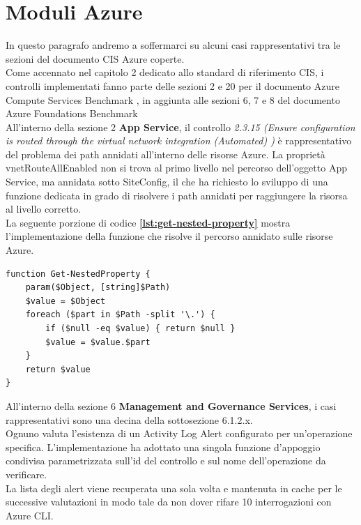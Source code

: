 \documentclass[a4paper,11pt]{report}
\begin{document}
\section{Moduli Azure}

In questo paragrafo andremo a soffermarci su alcuni casi rappresentativi tra le sezioni del documento CIS Azure coperte. \\
Come accennato nel capitolo 2 dedicato allo standard di riferimento CIS, i controlli implementati fanno parte delle sezioni 2 e 20 per il documento Azure Compute Services Benchmark \cite{CIS_Azure_2}, in aggiunta alle sezioni 6, 7 e 8 del documento Azure Foundations Benchmark \cite{CIS_Azure_1} \\

All'interno della sezione 2 \textbf{App Service}, il controllo \textit{2.3.15 (Ensure configuration is routed through the virtual network integration (Automated) )} è rappresentativo del problema dei path annidati all'interno delle risorse Azure. La proprietà vnetRouteAllEnabled non si trova al primo livello nel percorso dell'oggetto App Service, ma annidata sotto SiteConfig, il che ha richiesto lo sviluppo di una funzione dedicata in grado di risolvere i path annidati per raggiungere la risorsa al livello corretto.\\
La seguente porzione di codice \textbf{\ref{lst:get-nested-property}} mostra l'implementazione della funzione che risolve il percorso annidato sulle risorse Azure.
\begin{lstlisting}[style=azcli, caption={Funzione \texttt{Get-NestedProperty} per la risoluzione di percorsi annidati}, label={lst:get-nested-property}]
function Get-NestedProperty {
    param($Object, [string]$Path)
    $value = $Object
    foreach ($part in $Path -split '\.') {
        if ($null -eq $value) { return $null }
        $value = $value.$part
    }
    return $value
}
\end{lstlisting}

All'interno della sezione 6 \textbf{Management and Governance Services}, i casi rappresentativi sono una decina della sottosezione 6.1.2.x.\\
Ognuno valuta l'esistenza di un Activity Log Alert configurato per un'operazione specifica. L'implementazione ha adottato una singola funzione d'appoggio condivisa parametrizzata sull'id del controllo e sul nome dell'operazione da verificare. \\
La lista degli alert viene recuperata una sola volta e mantenuta in cache per le successive valutazioni in modo tale da non dover rifare 10 interrogazioni con Azure CLI. \\
\end{document}

